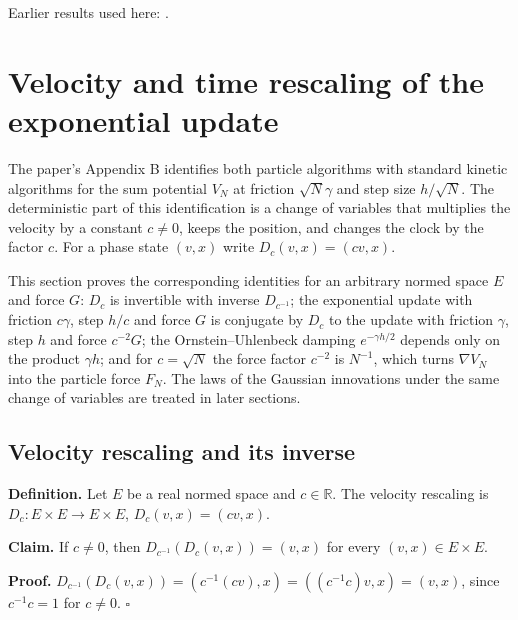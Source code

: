 \documentclass[11pt,a4paper]{report}
\begin{document}
Earlier results used here: \cite[Section~3.1.1]{LangevinLean2026IPLA}.
\section{\texorpdfstring{Velocity and time rescaling of the exponential update}{Velocity and time rescaling of the exponential update}}
\label{proof-module-KIPLMC-Rescaling-lean}


The paper's Appendix B identifies both particle algorithms with standard kinetic algorithms for the sum potential \(V_N\) at friction \(\sqrt N\gamma\) and step size \(h/\sqrt N\). The deterministic part of this identification is a change of variables that multiplies the velocity by a constant \(c\ne0\), keeps the position, and changes the clock by the factor \(c\). For a phase state \((v,x)\) write \(D_c(v,x)=(cv,x)\).




This section proves the corresponding identities for an arbitrary normed space \(E\) and force \(G\): \(D_c\) is invertible with inverse \(D_{c^{-1}}\); the exponential update with friction \(c\gamma\), step \(h/c\) and force \(G\) is conjugate by \(D_c\) to the update with friction \(\gamma\), step \(h\) and force \(c^{-2}G\); the Ornstein–Uhlenbeck damping \(e^{-\gamma h/2}\) depends only on the product \(\gamma h\); and for \(c=\sqrt N\) the force factor \(c^{-2}\) is \(N^{-1}\), which turns \(\nabla V_N\) into the particle force \(F_N\). The laws of the Gaussian innovations under the same change of variables are treated in later sections.

\subsection{\texorpdfstring{Velocity rescaling and its inverse}{Velocity rescaling and its inverse}}
\label{report-step-KIPLMC-Rescaling-lean-1}


\textbf{Definition.} Let \(E\) be a real normed space and \(c\in\mathbb R\). The velocity rescaling is \(D_c:E\times E\to E\times E\), \(D_c(v,x)=(cv,x)\).




\textbf{Claim.} If \(c\ne0\), then \(D_{c^{-1}}(D_c(v,x))=(v,x)\) for every \((v,x)\in E\times E\).




\textbf{Proof.} \(D_{c^{-1}}(D_c(v,x))=(c^{-1}(cv),x)=((c^{-1}c)v,x)=(v,x)\), since \(c^{-1}c=1\) for \(c\ne0\). \(\square\)
\end{document}
